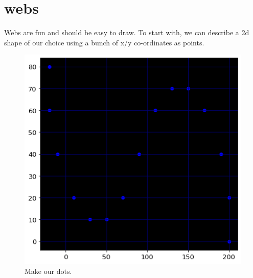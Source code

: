 \chapter{webs}
\label{sec:webs}
\lhead[tempest 2000]{}
\lstset{style=68KStyle}

Webs are fun and should be easy to draw. To start with, we can describe a 2d shape
of our choice using a bunch of x/y co-ordinates as points.
\begin{figure}[H]
    \centering
    \begin{adjustbox}{width=7cm,center}
      \includegraphics[width=12cm]{src/webs/sine_wave_dots_no_title.png}%
    \end{adjustbox}
  \caption{Make our dots.}
\end{figure}

